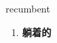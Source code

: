 
\begin{frame}
{\huge recumbent}
\begin{center}
\begin{enumerate}\Large
  \item \textbf{躺着的}
\end{enumerate}
\end{center}
\end{frame}
